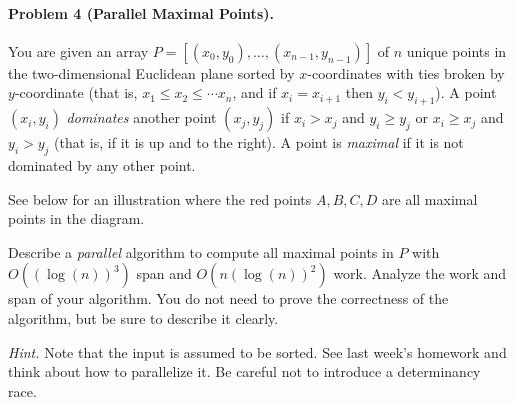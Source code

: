 \documentclass[11pt]{article}
\begin{document}
\newpage
\paragraph{Problem 4 (Parallel Maximal Points).} You are given an array $P = [(x_0, y_0), \dots, (x_{n-1}, y_{n-1})]$ of $n$ unique points in the two-dimensional Euclidean plane sorted by $x$-coordinates with ties broken by $y$-coordinate (that is, $x_1 \leq x_2 \leq \cdots x_n$, and if $x_i = x_{i+1}$ then $y_{i} < y_{i+1}$). A point \( (x_i, y_i) \) \textit{dominates} another point \( (x_j, y_j) \) if \( x_i > x_j \) and \( y_i \geq y_j \) or \( x_i \geq x_j \) and \( y_i > y_j \) (that is, if it is up and to the right). A point is \textit{maximal} if it is not dominated by any other point.

See below for an illustration where the red points $A,B,C,D$ are all maximal points in the diagram.
\begin{center}
\end{center}

Describe a \textit{parallel} algorithm to compute all maximal points in $P$ with $O((\log(n))^3)$ span and $O(n (\log(n))^2)$ work. Analyze the work and span of your algorithm. You do not need to prove the correctness of the algorithm, but be sure to describe it clearly.

\textit{Hint.} Note that the input is assumed to be sorted. See last week's homework and think about how to parallelize it. Be careful not to introduce a determinancy race.
\end{document}
